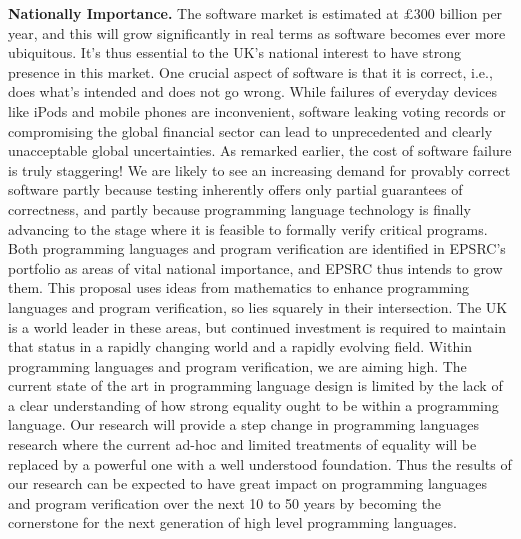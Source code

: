 \documentclass[a4paper,11pt]{article}
\begin{document}
{\bf Nationally Importance.} The software market is estimated at
$\pounds 300$
billion per year, and this will grow 
significantly in real terms 
as software becomes ever more
ubiquitous. It's thus essential to the UK's national interest to have 
strong presence in this market. One crucial aspect of software is that
it is correct, i.e., does what's intended and does not go wrong.  While
failures of everyday devices like iPods and mobile phones are
inconvenient,
software leaking voting records or
compromising %
the global financial sector can lead to unprecedented and clearly
unacceptable global uncertainties. As remarked earlier, the cost of
software failure is truly staggering! 
We are likely to see an increasing
demand for provably correct software partly because testing
inherently offers only partial guarantees of correctness, and partly because
programming language technology is finally advancing to the stage
where it is feasible to formally verify critical programs.
Both programming languages and program verification are identified in
EPSRC's portfolio as areas of vital 
national importance, and EPSRC
thus intends to grow them.
This proposal 
uses ideas from mathematics  to enhance 
programming languages and  program
verification, so lies squarely in their intersection. %
The UK is a world leader
in these areas, but continued investment is required to maintain that
status in a rapidly changing world and a rapidly evolving field.
Within programming languages and program verification, we are aiming
high.  The current state of the art in programming language design is
limited by the lack of a clear understanding of how strong equality
ought to be within a programming language. Our research will provide a
step change in programming languages research where the current
ad-hoc and limited treatments of equality will be replaced by a
powerful one with a well
understood foundation. Thus the results of our research can be
expected to have great impact on programming languages and program
verification over the next 10 to 50 years by
becoming the cornerstone for the next generation of high level
programming languages.
\end{document}
